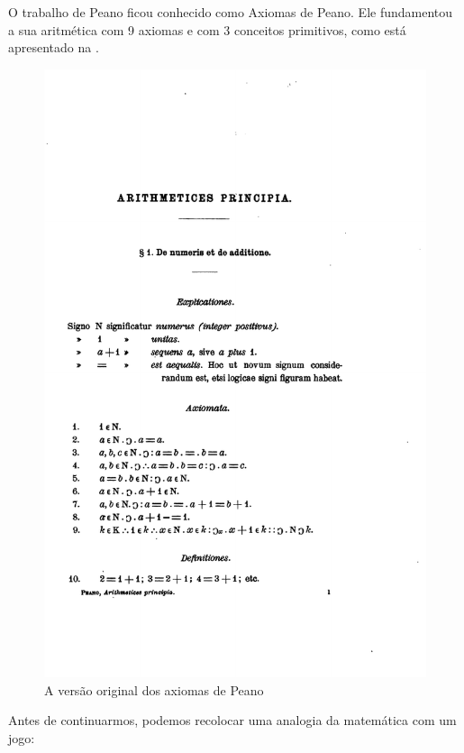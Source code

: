 \documentclass[../main.tex]{subfiles}
\begin{document}
O trabalho de Peano ficou conhecido como Axiomas de Peano. Ele fundamentou a sua aritmética com 9 axiomas e com 3 conceitos primitivos, como está apresentado na .
\begin{figure}
    \begin{center}
        \includegraphics{../include/peano_axioms_original}
        \caption{A versão original dos axiomas de Peano}\label{fig:axiomas-peano}
    \end{center}  
\end{figure}

Antes de continuarmos, podemos recolocar uma analogia da matemática com um jogo:
\end{document}
